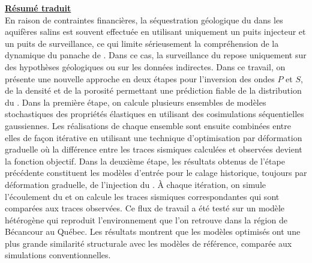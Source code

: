 {\underline{\textbf{Résumé traduit}}\\
En raison de contraintes financières, la séquestration géologique du 
dans les aquifères salins est souvent effectuée en utilisant uniquement un puits
injecteur et un puits de surveillance, ce qui limite sérieusement la
compréhension de la dynamique du panache de . Dans ce cas, la
surveillance du  repose uniquement sur des hypothèses géologiques ou sur
les données indirectes. Dans ce travail, on présente une nouvelle approche en
deux étapes pour l'inversion des ondes $P$ et $S$, de la densité et de la
porosité permettant une prédiction fiable
de la distribution du . Dans la première étape, on calcule plusieurs
ensembles de modèles stochastiques des propriétés élastiques en utilisant des
cosimulations séquentielles gaussiennes. Les réalisations de chaque ensemble
sont ensuite combinées entre elles de façon itérative en utilisant une technique
d'optimisation par déformation graduelle où la différence entre les traces
sismiques calculées et observées devient la fonction objectif. Dans la deuxième
étape, les résultats obtenus de l'étape précédente constituent les modèles
d'entrée pour le calage historique, toujours par déformation graduelle, de
l'injection du . À chaque itération, on simule l'écoulement du 
et on calcule les traces sismiques correspondantes qui sont comparées aux traces
observées. Ce flux de travail a été testé sur un modèle hétérogène qui reproduit
l'environnement que l'on retrouve dans la région de Bécancour au Québec. Les
résultats montrent que les modèles optimisés ont une plus grande similarité
structurale avec les modèles de référence, comparée aux simulations
conventionnelles.
}

